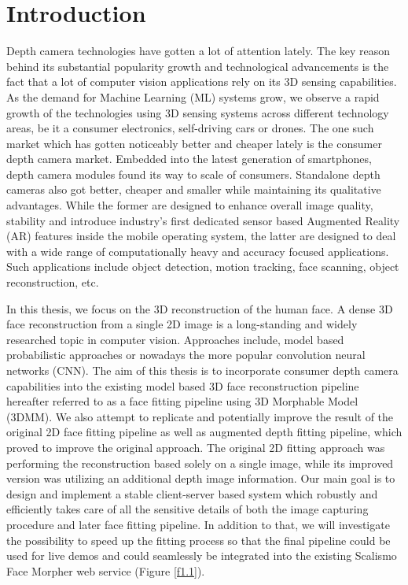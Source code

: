 \chapter{Introduction}\label{ch1}

Depth camera technologies have gotten a lot of attention lately. The key reason behind its substantial popularity growth and technological advancements is the fact that a lot of computer vision applications rely on its 3D sensing capabilities. As the demand for Machine Learning (ML) systems grow, we observe a rapid growth of the technologies using 3D sensing systems across different technology areas, be it a consumer electronics, self-driving cars or drones. The one such market which has gotten noticeably better and cheaper lately is the consumer depth camera market. Embedded into the latest generation of smartphones, depth camera modules found its way to scale of consumers. Standalone depth cameras also got better, cheaper and smaller while maintaining its qualitative advantages. While the former are designed to enhance overall image quality, stability and introduce industry's first dedicated sensor based Augmented Reality (AR) features inside the mobile operating system, the latter are designed to deal with a wide range of computationally heavy and accuracy focused applications. Such applications include object detection, motion tracking, face scanning, object reconstruction, etc. \bigskip 

In this thesis, we focus on the 3D reconstruction of the human face. A dense 3D face reconstruction from a single 2D image is a long-standing and widely researched topic in computer vision. Approaches include, model based probabilistic approaches\cite{Romdhani3DM, Schoenborn2017, 10.1007/978-3-642-40602-7_11} or nowadays the more popular convolution neural networks (CNN)\cite{Guo_2019, tu2019joint}. The aim of this thesis is to incorporate consumer depth camera capabilities into the existing model based 3D face reconstruction pipeline hereafter referred to as a face fitting pipeline using 3D Morphable Model (3DMM)\cite{Blanz:1999:MMS:311535.311556, Romdhani3DM}. We also attempt to replicate and potentially improve the result of the original 2D face fitting pipeline \cite{Schoenborn2017} as well as augmented depth fitting \cite{betschard2016} pipeline, which proved to improve the original approach. The original 2D fitting approach was performing the reconstruction based solely on a single image, while its improved version was utilizing an additional depth image information. Our main goal is to design and implement a stable client-server based system which robustly and efficiently takes care of all the sensitive details of both the image capturing procedure and later face fitting pipeline. In addition to that, we will investigate the possibility to speed up the fitting process so that the final pipeline could be used for live demos and could seamlessly be integrated into the existing Scalismo Face Morpher web service (Figure \ref{f1.1}). 

